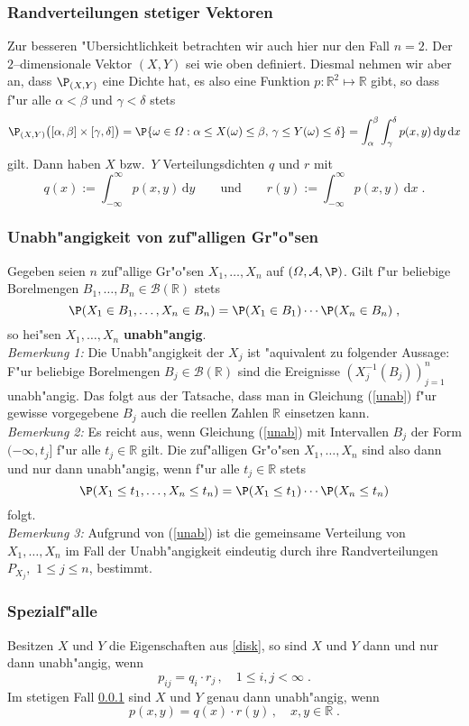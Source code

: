 \documentclass[ngerman,draft,parskip=half,twoside]{scrartcl}
\newcommand*{\R}{\mathbb{R}}      %
\newcommand*{\Algeb}{\mathcal{A}}   %
\newcommand*{\BorelM}{\mathcal{B}}  %
\begin{document}
\subsubsection{Randverteilungen stetiger Vektoren}
\label{stet}
Zur besseren "Ubersichtlichkeit betrachten wir auch hier nur den Fall $n=2$. Der
$2$--dimensionale Vektor $(X,Y)$ sei wie oben definiert. Diesmal nehmen wir aber an, dass
$\P_{(X,Y)}$ eine Dichte hat, es also eine Funktion $p \colon\R^2\mapsto\R$ gibt, so
dass f"ur alle $\alpha<\beta$ und $\gamma<\delta$ stets
$$
\P_{(X,Y)}\big([\alpha,\beta]\times[\gamma,\delta]\big)
=\P\{\omega\in \Omega : \alpha\le X(\omega)\le\beta,\,\gamma\le Y(\omega)\le\delta\}
=\int_\alpha^\beta\int_\gamma^\delta p(x,y)\,\mathrm d y \,\mathrm d x
$$
gilt. Dann haben $X$ bzw.~$Y$ Verteilungsdichten $q$ und $r$ mit
$$
q(x):=\int_{-\infty}^\infty p(x,y)\,\mathrm d y\qquad\mbox{und}\qquad
r(y):=\int_{-\infty}^\infty p(x,y)\,\mathrm d x\;.
$$
\subsubsection{Unabh"angigkeit von zuf"alligen Gr"o"sen}
Gegeben seien $n$ zuf"allige Gr"o"sen $X_1,\ldots,X_n$ auf $(\Omega,\Algeb,\P)$. Gilt f"ur beliebige
Borelmengen $B_1,\ldots,B_n\in\BorelM(\R)$ stets
\begin{equation}
\label{unab}
\P(X_1\in B_1,\ldots,X_n\in B_n)=\P(X_1\in B_1)\cdots\P(X_n\in B_n)\;,
\end{equation}
so hei"sen $X_1,\ldots,X_n$ \textbf{unabh"angig}.\\
\textit{Bemerkung 1:} Die Unabh"angigkeit der $X_j$ ist "aquivalent zu folgender Aussage$\colon$ F"ur
beliebige Borelmengen $B_j\in\BorelM(\R)$ sind die Ereignisse $\left(X_j^{-1}(B_j)\right)_{j=1}^n$
unabh"angig. Das folgt aus der Tatsache, dass man in Gleichung (\ref{unab}) f"ur gewisse vorgegebene $B_j$ auch die
reellen Zahlen $\R$ einsetzen kann.\\
\textit{Bemerkung 2:} Es reicht aus, wenn Gleichung (\ref{unab}) mit Intervallen $B_j$ der Form
$(-\infty,t_j]$ f"ur alle $t_j\in\R$ gilt. Die zuf"alligen Gr"o"sen $X_1,\ldots,X_n$ sind also
dann und nur dann unabh"angig, wenn f"ur alle $t_j\in\R$ stets
$$
\P(X_1\le t_1,\ldots,X_n\le t_n)=\P(X_1\le t_1)\cdots\P(X_n\le t_n)
$$
folgt.\\
\textit{Bemerkung 3:} Aufgrund von (\ref{unab}) ist die gemeinsame Verteilung von $X_1,\ldots,X_n$
im Fall der Unabh"angigkeit eindeutig durch
ihre Randverteilungen $P_{X_j},$ $1\le j\le n$, bestimmt.
\subsubsection{Spezialf"alle}
Besitzen $X$ und $Y$ die Eigenschaften aus \ref{disk}, so sind $X$ und $Y$ dann und nur  dann
unabh"angig, wenn
$$
p_{ij}=q_i\cdot r_j\,,\quad 1\le i,j<\infty\;.
$$
Im stetigen Fall \ref{stet} sind $X$ und $Y$ genau dann unabh"angig, wenn
$$
p(x,y)=q(x)\cdot r(y)\,,\quad x,y\in\R\;.
$$
\end{document}
